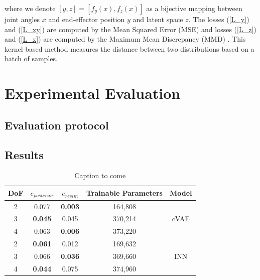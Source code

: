 \documentclass[conference]{IEEEtran}
\begin{document}
where we denote $[y, z] = [f_y(x), f_z(x)]$ as a bijective mapping between joint angles $x$ and end-effector position $y$ and latent space $z$. The losses (\ref{L_y}) and (\ref{L_xy}) are computed by the Mean Squared Error (MSE) and losses (\ref{L_z}) and (\ref{L_x}) are computed by the Maximum Mean Discrepancy (MMD) \cite{Gretton2008}. This kernel-based method measures the distance between two distributions based on a batch of samples.

\section*{Experimental Evaluation}

\subsection*{Evaluation protocol}
\subsection*{Results}

\begin{table}[h]
\centering
\begin{tabular}{|c|c|c|c|c|}
\hline
 DoF & $e_{posterior}$ & $e_{resim}$ & Trainable Parameters & Model \\
 \hline
 2  & 0.077 & \textbf{0.003} & 164,808 & \\
 3  & \textbf{0.045} & 0.045 & 370,214 & cVAE \\
 4  & 0.063 & \textbf{0.006} & 373,220 & \\
 \hline
 2  & \textbf{0.061} & 0.012 & 169,632 & \\
 3  & 0.066 & \textbf{0.036} & 369,660 & INN \\
 4  & \textbf{0.044} & 0.075 & 374,960 & \\
 \hline
\end{tabular}
\caption{\label{tab:results} Caption to come}
\end{table}
\end{document}
